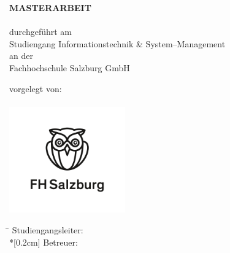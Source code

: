 \begin{titlepage}

\hspace{7cm}

\begin{center}
	{\bf\Huge\uppercase\expandafter{Masterarbeit}}\\[0.5ex]
	\vspace{1cm}
	\Large{\bf\Large \Title}\\
	\vspace{1.5cm}
	\normalsize durchgeführt am\\
	Studiengang Informationstechnik \& System--Management\\
	an der\\
	Fachhochschule Salzburg GmbH\\
\end{center}

\vspace{2cm}

\begin{center}
	\normalsize vorgelegt von:
	\\
	{
		\Large{\bf\large \Author}\\
	}
	\vspace{0.5cm}
	\includegraphics[width=5cm]{Figs/logo.jpg}\medskip
\end{center}
	
\vspace{0.5cm}

\begin{tabbing}
	\hspace*{3cm}\=\hspace*{4cm}\= \kill
	\> Studiengangsleiter: \> \HeadOfDepartment \\*[0.2cm]
	\> Betreuer: \> \Supervisor
\end{tabbing}

\vfill	

\begin{center}
\VenueMonthYear\\
\end{center}
\end{titlepage}